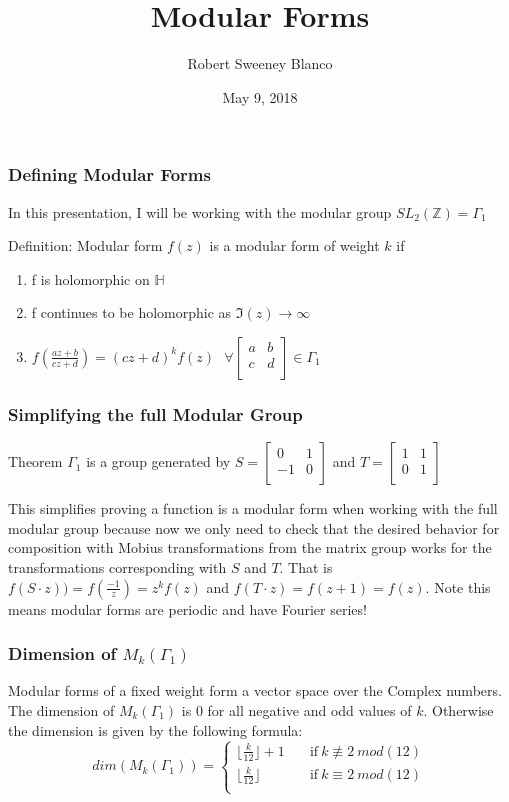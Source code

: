 \documentclass{beamer}
\title{Modular Forms}
\author{Robert Sweeney Blanco}
\institute{Advisor: Brandon Williams}
\date{May 9, 2018}
\begin{document}
 
\frame{\titlepage}
 
\begin{frame}
\frametitle{Defining Modular Forms}
In this presentation, I will be working with the modular group $SL_2(\mathbb{Z}) = \Gamma_1$
\begin{block}{Definition: Modular form}
$f(z)$ is a modular form of weight $k$ if 
\begin{enumerate}
\item  f is holomorphic on $\mathbb{H}$\\
\item f continues to be holomorphic as $\Im(z) \longrightarrow \infty$
\item $f(\frac{az+b}{cz+d}) = (cz+d)^k f(z) \  \ \ \forall \begin{bmatrix}
a & b \\
c & d \\
\end{bmatrix} 
\in \Gamma_1$
\end{enumerate}
\end{block}
\end{frame}

\begin{frame}
\frametitle{Simplifying the full Modular Group}
\begin{block}{Theorem}
$\Gamma_1$ is a group generated by $S = \begin{bmatrix}
0 & 1 \\
-1 & 0 \\
\end{bmatrix}$
and $T = \begin{bmatrix}
1 & 1 \\
0 & 1 \\
\end{bmatrix}$
\end{block}
This simplifies proving a function is a modular form when working with the full modular group because now we only need to check that the desired behavior for composition with Mobius transformations from the matrix group works for the transformations corresponding with $S$ and $T$. That is $f(S \cdot z))=f(\frac{-1}{z}) = z^kf(z)$ and $f(T \cdot z)=f(z+1)=f(z)$. Note this means modular forms are periodic and have Fourier series!
\end{frame}

\begin{frame}

\frametitle{Dimension of $M_k(\Gamma_1)$}
Modular forms of a fixed weight form a vector space over the Complex numbers. The dimension of $M_k(\Gamma_1)$ is $0$ for all negative and odd values of $k$. Otherwise the dimension is given by the following formula:
\[   
dim(M_k(\Gamma_1)) = 
     \begin{cases}
       \lfloor \frac{k}{12} \rfloor + 1 & \quad \text{if} \  k \not \equiv  2 \ mod(12) \\
       \lfloor \frac{k}{12} \rfloor & \quad \text{if} \  k \equiv  2 \ mod(12) \\
     \end{cases}
\]
\end{frame}
\end{document}
